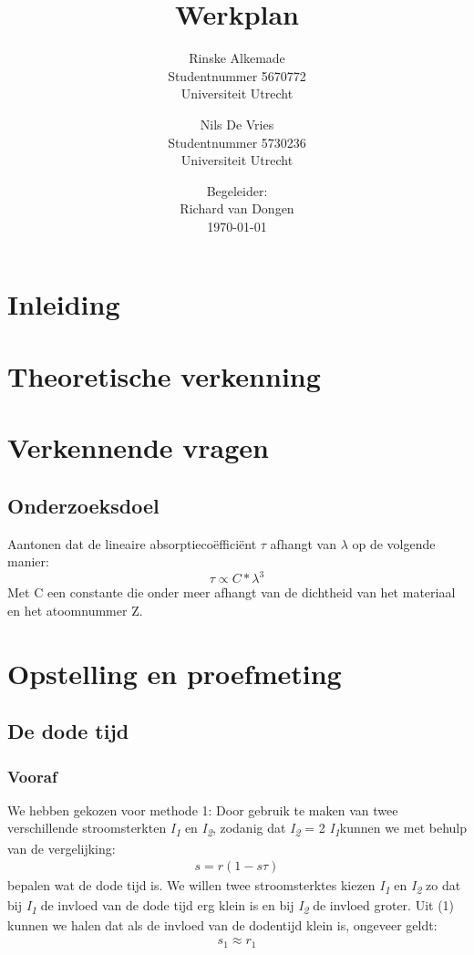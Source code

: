 \documentclass[a4paper]{article}
\begin{document}
\title{Werkplan}
\author{Rinske Alkemade\\ 
        Studentnummer 5670772 \\
        Universiteit Utrecht
		\and
		Nils De Vries\\ 
        Studentnummer 5730236  \\
        Universiteit Utrecht
        }

\date{Begeleider: \\ 
Richard van Dongen \\
\today}
\maketitle

\newpage

\section{Inleiding} 
\label{sec:inleiding} 

\section{Theoretische verkenning}
\section{Verkennende vragen}
\subsection{Onderzoeksdoel }
Aantonen dat de lineaire absorptieco\"{e}ffici\"{e}nt $\tau$ afhangt van $\lambda$  op de volgende manier:
$$
\tau \propto C*{\lambda}^3
$$
Met C een constante die onder meer afhangt van de dichtheid van het materiaal en het atoomnummer Z.  
\section{Opstelling en proefmeting}
\subsection{De dode tijd}
\subsubsection{Vooraf}
We hebben gekozen voor methode 1: Door gebruik te maken van twee verschillende stroomsterkten \textit{I\textsubscript{1}} en \textit{I\textsubscript{2}}, zodanig dat \textit{I\textsubscript{2}} = 2 \textit{I\textsubscript{1}}kunnen we met behulp van de vergelijking:
\begin{align}
s=r(1-s\tau)
\end{align}
bepalen wat de dode tijd is.
We willen twee stroomsterktes kiezen \textit{I\textsubscript{1}} en \textit{I\textsubscript{2}} zo dat bij \textit{I\textsubscript{1}} de invloed van de dode tijd erg klein  is en bij \textit{I\textsubscript{2}} de invloed groter. Uit (1) kunnen we halen dat als de invloed van de dodentijd klein is, ongeveer geldt: 
\begin{align}
s_1\approx r_1
\end{align} 
\end{document}
